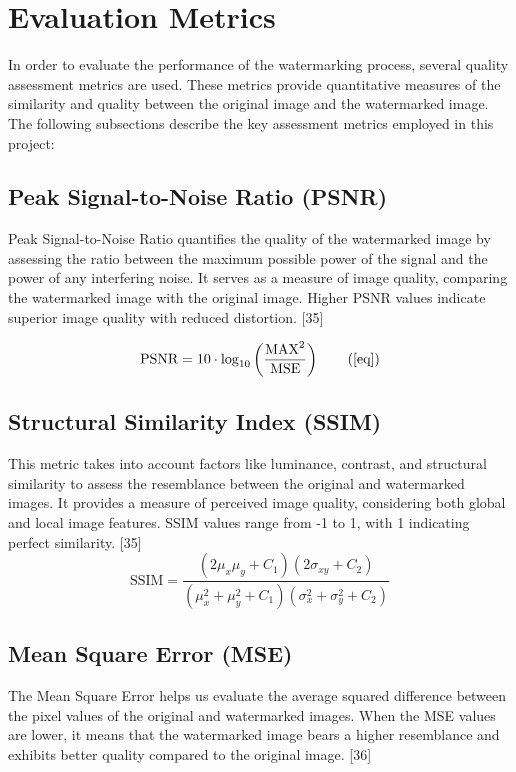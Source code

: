 \documentclass[conference]{IEEEtran}
\begin{document}
\section{Evaluation Metrics}

In order to evaluate the performance of the watermarking process, several quality assessment metrics are used. These metrics provide quantitative measures of the similarity and quality between the original image and the watermarked image. The following subsections describe the key assessment metrics employed in this project:

\subsection{Peak Signal-to-Noise Ratio (PSNR)}
Peak Signal-to-Noise Ratio quantifies the quality of the watermarked image by assessing the ratio between the maximum possible power of the signal and the power of any interfering noise. It serves as a measure of image quality, comparing the watermarked image with the original image. Higher PSNR values indicate superior image quality with reduced distortion. [35]

\begin{equation}
\text{PSNR} = 10 \cdot \log_{10} \left( \frac{{\text{MAX}^2}}{{\text{MSE}}} \right)
\tag{\ref{eq}}
\end{equation}

\subsection{Structural Similarity Index (SSIM)}
This metric takes into account factors like luminance, contrast, and structural similarity to assess the resemblance between the original and watermarked images. It provides a measure of perceived image quality, considering both global and local image features. SSIM values range from -1 to 1, with 1 indicating perfect similarity. [35]
\begin{equation}
\text{SSIM} = \frac{{(2 \mu_x \mu_y + C_1)(2 \sigma_{xy} + C_2)}}{{(\mu_x^2 + \mu_y^2 + C_1)(\sigma_x^2 + \sigma_y^2 + C_2)}}
\tag*{(2)}
\end{equation}


\subsection{Mean Square Error (MSE)}
The Mean Square Error helps us evaluate the average squared difference between the pixel values of the original and watermarked images. When the MSE values are lower, it means that the watermarked image bears a higher resemblance and exhibits better quality compared to the original image. [36]
\end{document}
